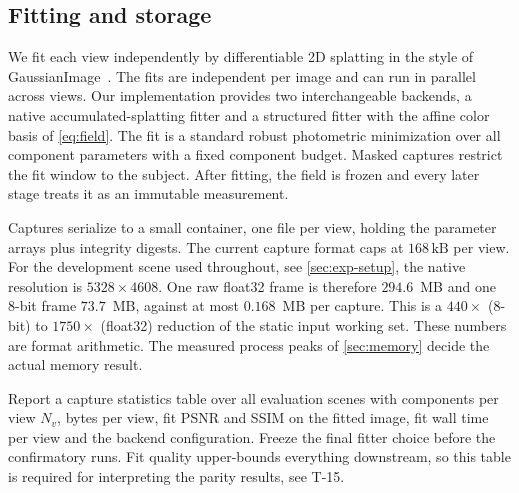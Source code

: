 \subsection{Fitting and storage}
\label{sec:fitting}

We fit each view independently by differentiable 2D splatting in the style of
GaussianImage~\citep{zhang2024_gaussianimage}.  The fits are independent per image and can
run in parallel across views.  Our implementation provides two interchangeable backends, a
native accumulated-splatting fitter and a structured fitter with the affine color basis of
\cref{eq:field}.  The fit is a standard robust photometric minimization over all component
parameters with a fixed component budget.  Masked captures restrict the fit window to the
subject.  After fitting, the field is frozen and every later stage treats it as an
immutable measurement.

Captures serialize to a small container, one file per view, holding the parameter arrays
plus integrity digests.  The current capture format caps at $168\,\mathrm{kB}$ per
view.  For the
development scene used throughout, see \cref{sec:exp-setup}, the native resolution is
$5328 \times 4608$.  One raw float32 frame is therefore $294.6$~MB and one 8-bit frame
$73.7$~MB, against at most $0.168$~MB per capture.  This is a $440\times$ (8-bit) to
$1750\times$ (float32) reduction of the static input working set.  These numbers are
format arithmetic.  The measured process peaks of \cref{sec:memory} decide the actual
memory result.

\begin{TodoBlock}
Report a capture statistics table over all evaluation scenes with components per view
$N_v$, bytes per view, fit PSNR and SSIM on the fitted image, fit wall time per view and
the backend configuration.  Freeze the final fitter choice before the confirmatory runs.
Fit quality upper-bounds everything downstream, so this table is required for
interpreting the parity results, see T-15.
\end{TodoBlock}

\begin{figure}[t]
  \centering
  \caption{}
  \label{fig:capture}
\end{figure}


